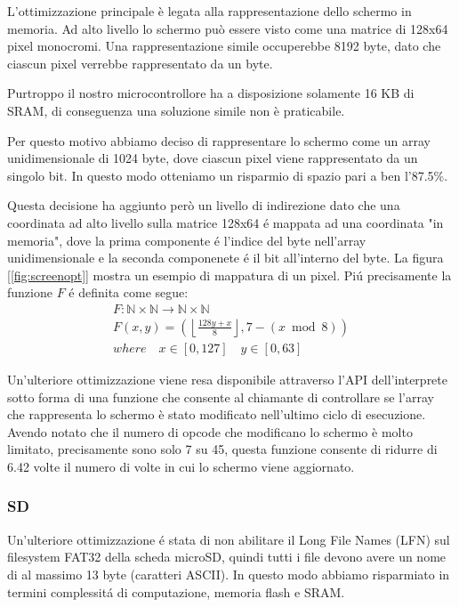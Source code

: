 \documentclass[a4paper]{article}
\begin{document}
L'ottimizzazione principale è legata alla rappresentazione dello schermo in memoria. Ad alto livello lo schermo può essere visto come una matrice di 128x64 pixel monocromi. Una rappresentazione simile occuperebbe 8192 byte, dato che ciascun pixel verrebbe rappresentato da un byte.

Purtroppo il nostro microcontrollore ha a disposizione solamente 16 KB di SRAM, di conseguenza una soluzione simile non è praticabile.

Per questo motivo abbiamo deciso di rappresentare lo schermo come un array unidimensionale di 1024 byte, dove ciascun pixel viene rappresentato da un singolo bit. In questo modo otteniamo un risparmio di spazio pari a ben l'87.5\%.

Questa decisione ha aggiunto però un livello di indirezione dato che una coordinata ad alto livello sulla matrice 128x64 é mappata ad una coordinata "in memoria", dove la prima componente é l'indice del byte nell'array unidimensionale e la seconda componenete é il bit all'interno del byte. La figura [\ref{fig:screenopt}] mostra un esempio di mappatura di un pixel. Piú precisamente la funzione $F$ é definita come segue:
\begin{gather*}
    F: \mathbb{N} \times \mathbb{N} \rightarrow \mathbb{N} \times \mathbb{N} \\
    F(x, y) = \left(\left\lfloor \frac{128y + x}{8} \right\rfloor, 7 - (x \bmod 8)\right) \\
    where \quad x \in [0, 127] \quad y \in [0, 63]
\end{gather*}

Un'ulteriore ottimizzazione viene resa disponibile attraverso l'API dell'interprete sotto forma di una funzione che consente al chiamante di controllare se l'array che rappresenta lo schermo è stato modificato nell'ultimo ciclo di esecuzione. Avendo notato che il numero di opcode che modificano lo schermo è molto limitato, precisamente sono solo 7 su 45, questa funzione consente di ridurre di 6.42 volte il numero di volte in cui
lo schermo viene aggiornato.

\subsubsection{SD}

Un'ulteriore ottimizzazione é stata di non abilitare il
Long File Names (LFN) sul filesystem FAT32 della scheda microSD,
quindi tutti i file devono avere un nome di al massimo 13 byte
(caratteri ASCII).
In questo modo abbiamo risparmiato in termini complessitá di computazione,
memoria flash e SRAM.
\end{document}
